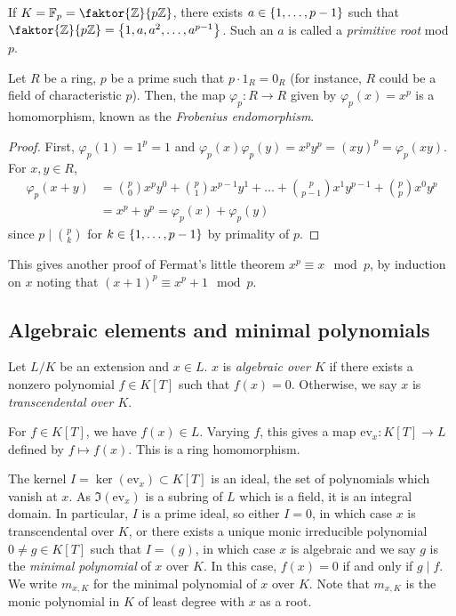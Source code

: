 \begin{remark}
	If \( K = \mathbb F_p = \faktor{\mathbb Z}{p\mathbb Z} \), there exists \( a \in \qty{1, \dots, p-1} \) such that \( \faktor{\mathbb Z}{p\mathbb Z} = \qty{1, a, a^2, \dots, a^{p-1}} \).
	Such an \( a \) is called a \emph{primitive root} mod \( p \).
\end{remark}
\begin{proposition}
	Let \( R \) be a ring, \( p \) be a prime such that \( p \cdot 1_R = 0_R \) (for instance, \( R \) could be a field of characteristic \( p \)).
	Then, the map \( \varphi_p \colon R \to R \) given by \( \varphi_p(x) = x^p \) is a homomorphism, known as the \emph{Frobenius endomorphism}.
\end{proposition}
\begin{proof}
	First, \( \varphi_p(1) = 1^p = 1 \) and \( \varphi_p(x)\varphi_p(y) = x^p y^p = (xy)^p = \varphi_p(xy) \).
	For \( x,y \in R \),
	\begin{align*}
		\varphi_p(x + y) &= \binom p 0 x^p y^0 + \binom p 1 x^{p-1} y^1 + \dots + \binom p {p-1} x^1 y^{p-1} + \binom p p x^0 y^p \\
		&= x^p + y^p = \varphi_p(x) + \varphi_p(y)
	\end{align*}
	since \( p \mid \binom p k \) for \( k \in \qty{1, \dots, p-1} \) by primality of \( p \).
\end{proof}
\begin{example}
	This gives another proof of Fermat's little theorem \( x^p \equiv x \mod p \), by induction on \( x \) noting that \( (x+1)^p \equiv x^p + 1 \mod p \).
\end{example}

\subsection{Algebraic elements and minimal polynomials}
\begin{definition}
	Let \( L / K \) be an extension and \( x \in L \).
	\( x \) is \emph{algebraic over \( K \)} if there exists a nonzero polynomial \( f \in K[T] \) such that \( f(x) = 0 \).
	Otherwise, we say \( x \) is \emph{transcendental over \( K \)}.
\end{definition}
For \( f \in K[T] \), we have \( f(x) \in L \).
Varying \( f \), this gives a map \( \mathrm{ev}_x \colon K[T] \to L \) defined by \( f \mapsto f(x) \).
This is a ring homomorphism.

The kernel \( I = \ker(\mathrm{ev}_x) \subset K[T] \) is an ideal, the set of polynomials which vanish at \( x \).
As \( \Im(\mathrm{ev}_x) \) is a subring of \( L \) which is a field, it is an integral domain.
In particular, \( I \) is a prime ideal, so either \( I = 0 \), in which case \( x \) is transcendental over \( K \), or there exists a unique monic irreducible polynomial \( 0 \neq g \in K[T] \) such that \( I = (g) \), in which case \( x \) is algebraic and we say \( g \) is the \emph{minimal polynomial} of \( x \) over \( K \).
In this case, \( f(x) = 0 \) if and only if \( g \mid f \).
We write \( m_{x,K} \) for the minimal polynomial of \( x \) over \( K \).
Note that \( m_{x,K} \) is the monic polynomial in \( K \) of least degree with \( x \) as a root.

